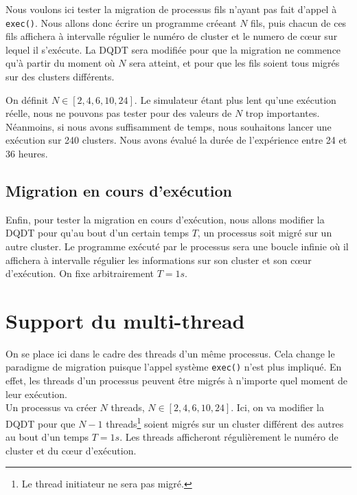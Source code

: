       Nous voulons ici tester la migration de processus fils n'ayant pas fait
      d'appel à \texttt{exec()}. Nous allons donc écrire un programme créeant
      $N$ fils, puis chacun de ces fils affichera à intervalle régulier le
      numéro de cluster et le numero de c\oe ur sur lequel il s'exécute. La DQDT
      sera modifiée pour que la migration ne commence qu'à partir du moment où
      $N$ sera atteint, et pour que les fils soient tous migrés sur des clusters
      différents.

      On définit $N \in [2, 4, 6, 10, 24]$. Le simulateur étant plus lent qu'une
      exécution réelle, nous ne pouvons pas tester pour des valeurs de $N$ trop
      importantes. Néanmoins, si nous avons suffisamment de temps, nous
      souhaitons lancer une exécution sur 240 clusters. Nous avons évalué la
      durée de l'expérience entre 24 et 36 heures.

    \subsection{Migration en cours d'exécution}

      Enfin, pour tester la migration en cours d'exécution, nous allons modifier
      la DQDT pour qu'au bout d'un certain temps $T$, un processus soit migré
      sur un autre cluster. Le programme exécuté par le processus sera une
      boucle infinie où il affichera à intervalle régulier les informations sur
      son cluster et son c\oe ur d'exécution. On fixe arbitrairement $T = 1s$.

  \section{Support du multi-thread}

    On se place ici dans le cadre des threads d'un même processus. Cela change
    le paradigme de migration puisque l'appel système \texttt{exec()} n'est plus
    impliqué. En effet, les threads d'un processus peuvent être migrés à
    n'importe quel moment de leur exécution.\\

    Un processus va créer $N$ threads, $N \in [2, 4, 6, 10, 24]$. Ici, on va
    modifier la DQDT pour que $N-1$ threads\footnote{Le thread initiateur ne
      sera pas migré.} soient migrés sur un cluster différent des autres au bout
    d'un temps $T = 1s$. Les threads afficheront régulièrement le numéro de
    cluster et du c\oe ur d'exécution.


